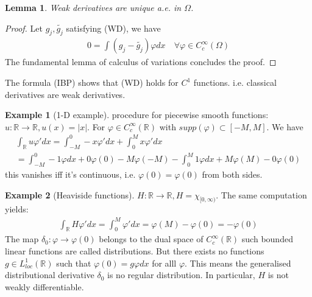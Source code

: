 \documentclass[a4paper,11pt,oneside,fleqn]{book}
\newtheorem{lemma}[theorem]{Lemma}
\theoremstyle{definition}
\newtheorem*{example}{Example}
\theoremstyle{remark}
\begin{document}
\begin{lemma}
	Weak derivatives are unique a.e. in $\Omega$. 
\end{lemma}
\begin{proof}
	Let $g_j, \tilde{g_j}$ satisfying (WD), we have
	\begin{align*}
		0 = \int (g_j - \tilde{g_j}) \varphi dx \quad \forall \varphi \in C_c^\infty(\Omega)
	\end{align*}
	The fundamental lemma of calculus of variations concludes the proof. 
\end{proof}

The formula (IBP) shows that (WD) holds for $C^1$ functions. i.e. classical derivatives are weak derivatives. 


\begin{example}[1-D example]
procedure for piecewise smooth functions: $u: \mathbb{R} \rightarrow \mathbb{R}, u(x) = |x|$. For $\varphi \in C_c^\infty(\mathbb{R})$ with $supp(\varphi) \subset [-M, M]$. We have
\begin{align*}
	\int_\mathbb{R} u \varphi' dx = \int_{-M}^0 -x \varphi'dx + \int_0^M x \varphi'dx \\
	= \int_{-M}^0 -1 \varphi dx + 0 \varphi(0) - M \varphi(-M) - \int_0^M 1 \varphi dx + M \varphi(M) - 0\varphi(0)
\end{align*}	
this vanishes iff it's continuous, i.e. $\varphi(0) = \varphi(0)$ from both sides.
\end{example}

\begin{example}[Heaviside functions]
$H: \mathbb{R} \rightarrow \mathbb{R}, H = \chi_{[0, \infty)}$. The same computation yields:
\begin{align*}
	\int_\mathbb{R} H \varphi'dx = \int_0^M \varphi' dx = \varphi(M) - \varphi(0) = - \varphi(0)
\end{align*}	
The map $\delta_0: \varphi \rightarrow \varphi(0)$ belongs to the dual space of $C_c^\infty(\mathbb{R})$ such bounded linear functions are called distributions. But there exists no functions $g \in L_{loc}^1(\mathbb{R})$ such that $\varphi(0) = g \varphi dx$ for alll $\varphi$. This means the generalised distributional derivative $\delta_0$ is no regular distribution. In particular, $H$ is not weakly differentiable. 
\end{example}
\end{document}
